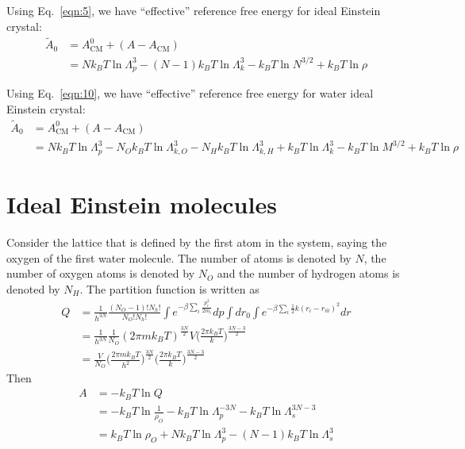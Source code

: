 \documentclass[aps,pre,a4paper,showkeys,fleqn]{revtex4}
\newcommand{\com}[0]{{\textrm{CM}}}
\begin{document}
Using Eq.~\eqref{eqn:5}, we  have ``effective'' reference free energy for ideal Einstein crystal:
\begin{align} \nonumber
  \tilde A_0
  &=
    A^0_\com + (A - A_\com) \\
  &=
    Nk_BT\ln \Lambda_p^3 - (N-1)k_BT\ln\Lambda_k^3 - k_BT\ln N^{3/2} + k_BT\ln \rho
\end{align}

Using Eq.~\eqref{eqn:10}, we  have ``effective'' reference free energy for water ideal Einstein crystal:
\begin{align} \nonumber
  \tilde A_0
  &=
    A^0_\com + (A - A_\com) \\
  &=
    Nk_BT\ln \Lambda_p^3 
    -N_Ok_BT\ln\Lambda_{k,O}^3
    -N_Hk_BT\ln\Lambda_{k,H}^3
    + k_BT\ln\Lambda_k^3
    - k_BT\ln M^{3/2} + k_BT\ln \rho
\end{align}






\section{Ideal Einstein molecules}
Consider the lattice that is defined by the first atom in the system, saying the oxygen of the first water molecule.
The number of atoms is denoted by $N$, the number of oxygen atoms is denoted by $N_O$ and the number of hydrogen atoms is denoted by $N_H$.
The partition function is written as
\begin{align*}
  Q & = \frac{1}{h^{3N}}
      \frac{(N_O-1)!N_h!}{N_O!N_h!}
      \int e^{-\beta\sum_i\frac{p_i^2}{2m_i}} dp
      \int dr_0\int e^{-\beta\sum_i \frac 12k(r_i - r_{i0})^2} dr \\
    &=
      \frac{1}{h^{3N}}\frac{1}{N_O}
      (2\pi m k_BT)^{\frac{3N}{2}}
      {V}
      \Big(\frac{2\pi k_BT}{k}\Big)^{\frac{3N-3}2} \\
    &=
      \frac{V}{N_O}
      \Big( \frac{2\pi m k_BT}{h^2} \Big)^{\frac{3N}{2}}
      \Big( \frac{2\pi k_BT}{k} \Big)^{\frac{3N-3}{2}}
\end{align*}
Then
\begin{align*}
  A
  &=
    -k_BT \ln Q \\
  &=
    -k_BT \ln \frac1{\rho_O} - k_BT \ln \Lambda_p^{-3N} - k_BT \ln \Lambda_s^{3N-3} \\
  &=
    k_BT \ln {\rho_O} + Nk_BT \ln \Lambda_p^3 - (N-1) k_BT \ln \Lambda_s^3
\end{align*}
\end{document}
